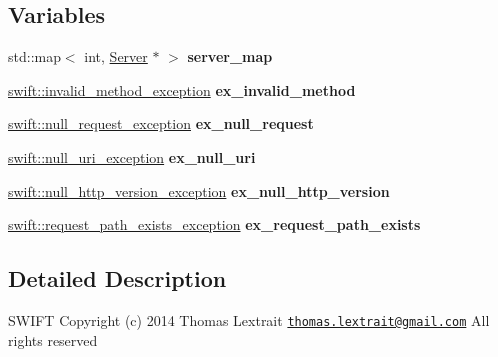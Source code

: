 \subsection*{Variables}
\begin{DoxyCompactItemize}
\item 
\hypertarget{namespaceswift_a0d54eeac3847161ee8afa83619ab7cc2}{std\-::map$<$ int, \hyperlink{classswift_1_1_server}{Server} $\ast$ $>$ {\bfseries server\-\_\-map}}\label{namespaceswift_a0d54eeac3847161ee8afa83619ab7cc2}

\item 
\hypertarget{namespaceswift_a96185be7719182de92b20647b128052b}{\hyperlink{classswift_1_1invalid__method__exception}{swift\-::invalid\-\_\-method\-\_\-exception} {\bfseries ex\-\_\-invalid\-\_\-method}}\label{namespaceswift_a96185be7719182de92b20647b128052b}

\item 
\hypertarget{namespaceswift_a67a56ddf2be450e8dc22dfd52ebea928}{\hyperlink{classswift_1_1null__request__exception}{swift\-::null\-\_\-request\-\_\-exception} {\bfseries ex\-\_\-null\-\_\-request}}\label{namespaceswift_a67a56ddf2be450e8dc22dfd52ebea928}

\item 
\hypertarget{namespaceswift_a1ca9a1afdfa380a315bbbfb2cf96e436}{\hyperlink{classswift_1_1null__uri__exception}{swift\-::null\-\_\-uri\-\_\-exception} {\bfseries ex\-\_\-null\-\_\-uri}}\label{namespaceswift_a1ca9a1afdfa380a315bbbfb2cf96e436}

\item 
\hypertarget{namespaceswift_ab9229c488c86b2179798ba62e2b27897}{\hyperlink{classswift_1_1null__http__version__exception}{swift\-::null\-\_\-http\-\_\-version\-\_\-exception} {\bfseries ex\-\_\-null\-\_\-http\-\_\-version}}\label{namespaceswift_ab9229c488c86b2179798ba62e2b27897}

\item 
\hypertarget{namespaceswift_a41eaa13aec3d1f079dceeb1676aef16f}{\hyperlink{classswift_1_1request__path__exists__exception}{swift\-::request\-\_\-path\-\_\-exists\-\_\-exception} {\bfseries ex\-\_\-request\-\_\-path\-\_\-exists}}\label{namespaceswift_a41eaa13aec3d1f079dceeb1676aef16f}

\end{DoxyCompactItemize}


\subsection{Detailed Description}
S\-W\-I\-F\-T Copyright (c) 2014 Thomas Lextrait \href{mailto:thomas.lextrait@gmail.com}{\tt thomas.\-lextrait@gmail.\-com} All rights reserved 

